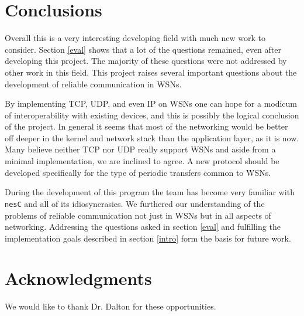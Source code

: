 \documentclass{sig-alternate}
\begin{document}
\section{Conclusions}\label{concl}
Overall this is a very interesting developing field with much new work to consider. Section \ref{eval} shows that a lot of the questions remained, even after developing this project. The majority of these questions were not addressed by other work in this field. This project raises several important questions about the development of reliable communication in WSNs.

By implementing TCP, UDP, and even IP on WSNs one can hope for a modicum of interoperability with existing devices, and this is possibly the logical conclusion of the project. In general it seems that most of the networking would be better off deeper in the kernel and network stack than the application layer, as it is now. Many believe neither TCP nor UDP really support WSNs and aside from a minimal implementation, we are inclined to agree. A new protocol should be developed specifically for the type of periodic transfers common to WSNs. 

During the development of this program the team has become very familiar with \texttt{nesC} and all of its idiosyncrasies. We furthered our understanding of the problems of reliable communication not just in WSNs but in all aspects of networking. Addressing the questions asked in section \ref{eval} and fulfilling the implementation goals described in section \ref{intro} form the basis for future work.

\section{Acknowledgments}
We would like to thank Dr. Dalton for these opportunities.

%


\end{document}
